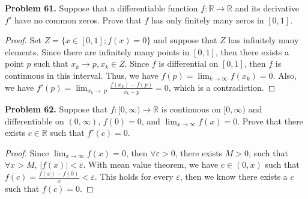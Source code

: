 \documentclass[12pt,leqno]{amsart}
\begin{document}
\medskip


\noindent
{\bf Problem 61.}
Suppose that a differentiable function $f:\mathbb{R}\to\mathbb{R}$ and its derivative $f'$ have no common zeros. Prove that $f$ has only finitely many zeros in $[0,1]$.
\begin{proof}
Set $Z=\{x\in[0,1];f(x)=0\}$ and suppose that $Z$ has infinitely many elements. Since there are infinitely many points in $[0,1]$, then there exists a point $p$ such that $x_k\rightarrow p, x_k\in Z$. Since $f$ is differential on $[0,1]$, then $f$ is continuous in this interval. Thus, we have $f(p)=\lim_{k\to\infty}f(x_k)=0$. Also, we have $f'(p)=\lim_{x_k\to\ p}\frac{f(x_k)-f(p)}{x_k-p}=0$, which is a contradiction.
\end{proof}

\medskip


\noindent
{\bf Problem 62.}
Suppose that $f:[0,\infty)\to\mathbb{R}$ is continuous on $[0,\infty)$ and differentiable on $(0,\infty)$, $f(0)=0$, and $\displaystyle\lim_{x\to\infty} f(x)=0$. Prove that there exists $c\in\mathbb{R}$ such that $f'(c)=0$.
\begin{proof}
Since $\lim_{x\to\infty}f(x)=0$, then $\forall \varepsilon>0$, there exists $M>0$, such that $\forall x>M$, $|f(x)|<\varepsilon$. With mean value theorem, we have $c\in(0,x)$ such that $f(c)=\frac{f(x)-f(0)}{x}<\varepsilon$. This holds for every $\varepsilon$, then we know there exists a $c$ such that $f(c)=0$.
\end{proof}

\medskip
\end{document}
